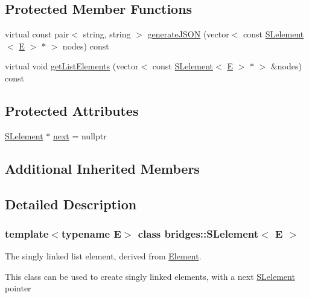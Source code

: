 \subsection*{Protected Member Functions}
\begin{DoxyCompactItemize}
\item 
virtual const pair$<$ string, string $>$ \mbox{\hyperlink{classbridges_1_1_s_lelement_a876b5af820b5fdac4854ace6a9c2e2a5}{generate\+J\+S\+ON}} (vector$<$ const \mbox{\hyperlink{classbridges_1_1_s_lelement}{S\+Lelement}}$<$ \mbox{\hyperlink{namespacebridges_acfb0a4f7877d8f63de3e6862004c50eda3a3ea00cfc35332cedf6e5e9a32e94da}{E}} $>$ $\ast$ $>$ nodes) const
\item 
virtual void \mbox{\hyperlink{classbridges_1_1_s_lelement_abcd5b5a42ce5641e988f5e00eace7b0a}{get\+List\+Elements}} (vector$<$ const \mbox{\hyperlink{classbridges_1_1_s_lelement}{S\+Lelement}}$<$ \mbox{\hyperlink{namespacebridges_acfb0a4f7877d8f63de3e6862004c50eda3a3ea00cfc35332cedf6e5e9a32e94da}{E}} $>$ $\ast$ $>$ \&nodes) const
\end{DoxyCompactItemize}
\subsection*{Protected Attributes}
\begin{DoxyCompactItemize}
\item 
\mbox{\hyperlink{classbridges_1_1_s_lelement}{S\+Lelement}} $\ast$ \mbox{\hyperlink{classbridges_1_1_s_lelement_ad7449d10a09ebc52653a7baed812aa43}{next}} = nullptr
\end{DoxyCompactItemize}
\subsection*{Additional Inherited Members}


\subsection{Detailed Description}
\subsubsection*{template$<$typename E$>$\newline
class bridges\+::\+S\+Lelement$<$ E $>$}

The singly linked list element, derived from \mbox{\hyperlink{classbridges_1_1_element}{Element}}. 

This class can be used to create singly linked elements, with a next \mbox{\hyperlink{classbridges_1_1_s_lelement}{S\+Lelement}} pointer

